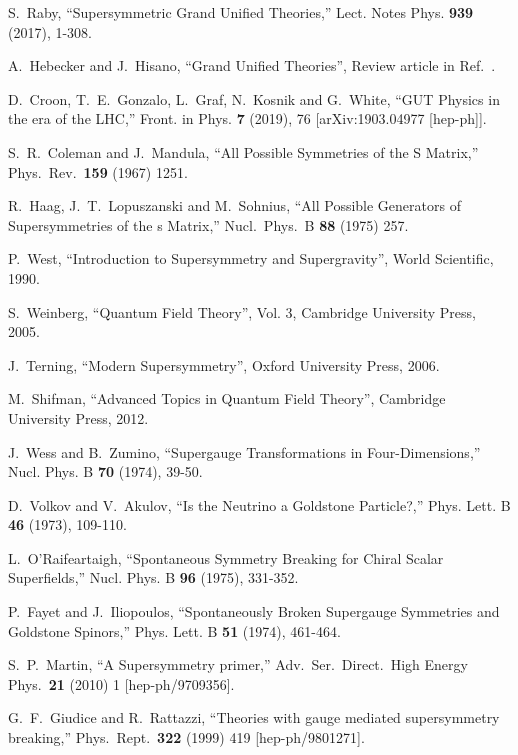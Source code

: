 \documentclass[12pt]{article}
\numberwithin{equation}{section}
\begin{document}
\begin{thebibliography}{999}
S.~Raby, ``Supersymmetric Grand Unified Theories,'' Lect. Notes Phys. \textbf{939} (2017), 1-308.

A.~Hebecker and J.~Hisano, ``Grand Unified Theories'', Review article in Ref.~\cite{Tanabashi:2018oca}.

D.~Croon, T.~E.~Gonzalo, L.~Graf, N.~Kosnik and G.~White, ``GUT Physics in the era of the LHC,''
Front. in Phys. \textbf{7} (2019), 76
[arXiv:1903.04977 [hep-ph]].

  S.~R.~Coleman and J.~Mandula,
  ``All Possible Symmetries of the S Matrix,''
  Phys.\ Rev.\  {\bf 159} (1967) 1251.

  R.~Haag, J.~T.~Lopuszanski and M.~Sohnius,
  ``All Possible Generators of Supersymmetries of the s Matrix,''
  Nucl.\ Phys.\ B {\bf 88} (1975) 257.

 P.~West, ``Introduction to Supersymmetry and Supergravity'', World Scientific, 1990.

 S.~Weinberg, ``Quantum Field Theory'', Vol. 3, Cambridge University Press, 2005.

 J.~Terning, ``Modern Supersymmetry'', Oxford University Press, 2006.

 M.~Shifman, ``Advanced Topics in Quantum Field Theory'', Cambridge University Press, 2012.

J.~Wess and B.~Zumino,
``Supergauge Transformations in Four-Dimensions,''
Nucl. Phys. B \textbf{70} (1974), 39-50.

D.~Volkov and V.~Akulov,
``Is the Neutrino a Goldstone Particle?,''
Phys. Lett. B \textbf{46} (1973), 109-110.

L.~O'Raifeartaigh,
``Spontaneous Symmetry Breaking for Chiral Scalar Superfields,''
Nucl. Phys. B \textbf{96} (1975), 331-352.

P.~Fayet and J.~Iliopoulos,
``Spontaneously Broken Supergauge Symmetries and Goldstone Spinors,''
Phys. Lett. B \textbf{51} (1974), 461-464.

  S.~P.~Martin,
  ``A Supersymmetry primer,''
  Adv.\ Ser.\ Direct.\ High Energy Phys.\  {\bf 21} (2010) 1
  [hep-ph/9709356].

  G.~F.~Giudice and R.~Rattazzi,
  ``Theories with gauge mediated supersymmetry breaking,''
  Phys.\ Rept.\  {\bf 322} (1999) 419
  [hep-ph/9801271].


\end{thebibliography}
\end{document}
